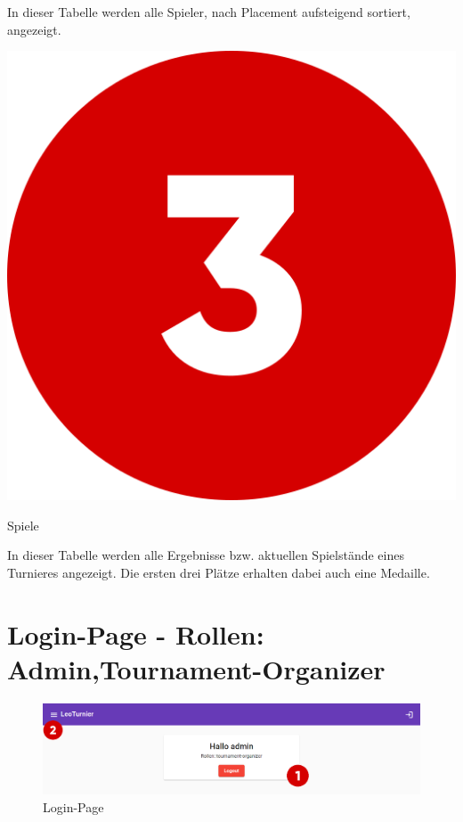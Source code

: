 In dieser Tabelle werden alle Spieler, nach Placement aufsteigend sortiert, angezeigt.

\bigskip
\includegraphics[scale=0.05]{pics/user-guide/numbers/number-3.png} \begin{LARGE} Spiele \end{LARGE}

In dieser Tabelle werden alle Ergebnisse bzw. aktuellen Spielstände eines Turnieres angezeigt.
Die ersten drei Plätze erhalten dabei auch eine Medaille.

\newpage
\section{Login-Page - Rollen: Admin,Tournament-Organizer}
\begin{figure}[H]
    \includegraphics[scale=0.4]{pics/user-guide/login-page.PNG}
    \caption{Login-Page}
\end{figure}
\bigskip

